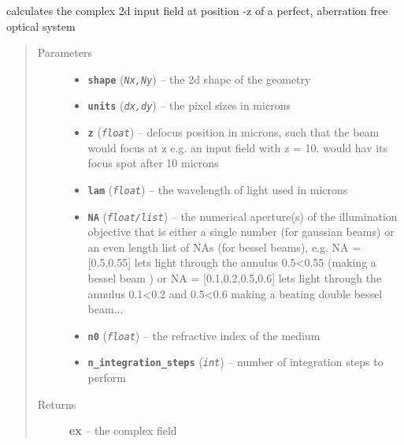 \documentclass[a4paper,10pt,english]{sphinxmanual}
\begin{document}
\begin{fulllineitems}
\label{beams:biobeam.focus_field_beam_plane}
calculates the complex 2d input field at position -z of a      perfect, aberration free optical system
\begin{quote}\begin{description}
\item[{Parameters}] \leavevmode\begin{itemize}
\item {} 
\textbf{\texttt{shape}} (\emph{\texttt{Nx,Ny}}) -- the 2d shape of the geometry

\item {} 
\textbf{\texttt{units}} (\emph{\texttt{dx,dy}}) -- the pixel sizes in microns

\item {} 
\textbf{\texttt{z}} (\emph{\texttt{float}}) -- defocus position in microns, such that the beam would focus at z
e.g. an input field with z = 10. would hav its focus spot after 10 microns

\item {} 
\textbf{\texttt{lam}} (\emph{\texttt{float}}) -- the wavelength of light used in microns

\item {} 
\textbf{\texttt{NA}} (\emph{\texttt{float/list}}) -- the numerical aperture(s) of the illumination objective
that is either a single number (for gaussian beams) or an
even length list of NAs (for bessel beams), e.g.
NA = {[}0.5,0.55{]} lets light through the annulus 0.5\textless{}0.55 (making a bessel beam ) or
NA = {[}0.1,0.2,0.5,0.6{]} lets light through the annulus 0.1\textless{}0.2 and 0.5\textless{}0.6 making a
beating double bessel beam...

\item {} 
\textbf{\texttt{n0}} (\emph{\texttt{float}}) -- the refractive index of the medium

\item {} 
\textbf{\texttt{n\_integration\_steps}} (\emph{\texttt{int}}) -- number of integration steps to perform

\end{itemize}

\item[{Returns}] \leavevmode
\textbf{ex} --
the complex field


\end{description}
\end{quote}
\end{fulllineitems}
\end{document}
